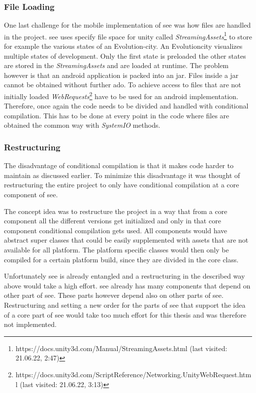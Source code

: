 \subsubsection{File Loading}
One last challenge for the mobile implementation of \gls{see} was how files are handled in the project.
\gls{see} uses specify file space for \gls{unity} called \textit{StreamingAssets}\footnote{https://docs.unity3d.com/Manual/StreamingAssets.html (last visited: 21.06.22, 2:47)} to store for example the various states of an Evolution-\gls{city}.
An Evolution\gls{city} visualizes multiple states of development.
Only the first state is preloaded the other states are stored in the \textit{StreamingAssets} and are loaded at runtime. 
The problem however is that an \gls{android} application is packed into an \gls{jar}.
Files inside a \gls{jar} cannot be obtained without further ado.
To achieve access to files that are not initially loaded \textit{WebRequests}\footnote{https://docs.unity3d.com/ScriptReference/Networking.UnityWebRequest.html (last visited: 21.06.22, 3:13)} have to be used for an \gls{android} implementation. 
Therefore, once again the code needs to be divided and handled with conditional compilation.
This has to be done at every point in the code where files are obtained the common way with \textit{SystemIO} methods. 


\subsubsection{Restructuring}
\label{sec:restructure}
The disadvantage of conditional compilation is that it makes code harder to maintain as discussed earlier.
To minimize this disadvantage it was thought of restructuring the entire project to only have conditional compilation at a core component of \gls{see}.

The concept idea was to restructure the project in a way that from a core component all the different versions get initialized and only in that core component conditional compilation gets used.
All components would have abstract super classes that could be easily supplemented with assets that are not available for all platform.
The platform specific classes would then only be compiled for a certain platform build, since they are divided in the core class.

Unfortunately \gls{see} is already entangled and a restructuring in the described way above would take a high effort.
\gls{see} already has many components that depend on other part of \gls{see}. 
These parts however depend also on other parts of \gls{see}. 
Restructuring and setting a new order for the parts of see that support the idea of a core part of \gls{see} would take too much effort for this thesis and was therefore not implemented.